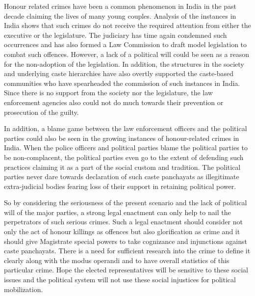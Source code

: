 \begin{multicols}{2}

\noi
Honour related crimes have been a common phenomenon in India in the past decade
claiming the lives of many young couples. Analysis of the instances in India shows that
such crimes do not receive the required attention from either the executive or the
legislature. The judiciary has time again condemned such occurrences and has also
formed a Law Commission to draft model legislation to combat such offences.
However, a lack of a political will could be seen as a reason for the non-adoption of the
legislation. In addition, the structures in the society and underlying caste hierarchies
have also overtly supported the caste-based communities who have spearheaded the
commission of such instances in India. Since there is no support from the society nor
the legislature, the law enforcement agencies also could not do much towards their
prevention or prosecution of the guilty. 

\noi
In addition, a blame game between the law enforcement officers and the political parties
could also be seen in the growing instances of honour-related crimes in India. When
the police officers and political parties blame the political parties to be non-complacent,
the political parties even go to the extent of defending such practices claiming it as a
part of the social custom and tradition. The political parties never dare towards
declaration of such caste panchayats as illegitimate extra-judicial bodies fearing loss of
their support in retaining political power. 

\noi
So by considering the seriousness of the present scenario and the lack of political will
of the major parties, a strong legal enactment can only help to nail the perpetrators of
such serious crimes. Such a legal enactment should consider not only the act of honour
killings as offences but also glorification as crime and it should give Magistrate special powers to take cognizance and injunctions against caste panchayats. There is a need for
sufficient research into the crime to define it clearly along with the modus operandi and
to have overall statistics of this particular crime. Hope the elected representatives will
be sensitive to these social issues and the political system will not use these social
injustices for political mobilization.

\end{multicols}
\label{end2016-art3}
